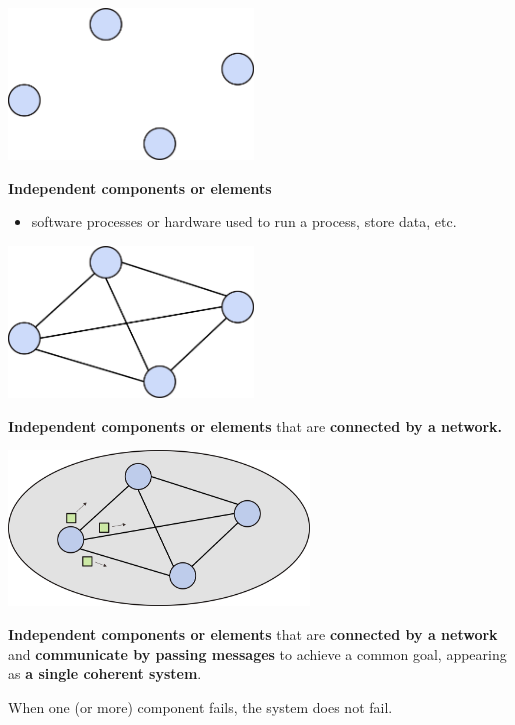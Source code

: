 \begin{slide}


    \includegraphics[width=65mm]{dfs-definition-1.png}
    \bigskip

    \textbf{Independent components or elements}
    \begin{itemize}
        \item software processes or hardware used to run a process, store data, etc.
    \end{itemize}

\end{slide}

\begin{slide}


    \includegraphics[width=65mm]{dfs-definition-2.png}
    \bigskip

    \textbf{Independent components or elements} that are \textbf{connected by a network.}

\end{slide}

\begin{slide}


    \includegraphics[width=80mm]{dfs-definition-4.png}
    \bigskip

    \textbf{Independent components or elements} that are \textbf{connected by a network} and \textbf{communicate by passing messages} to achieve a common goal, appearing as \textbf{a single coherent system}.
    \bigskip

    When one (or more) component fails, the system does not fail.

\end{slide}

